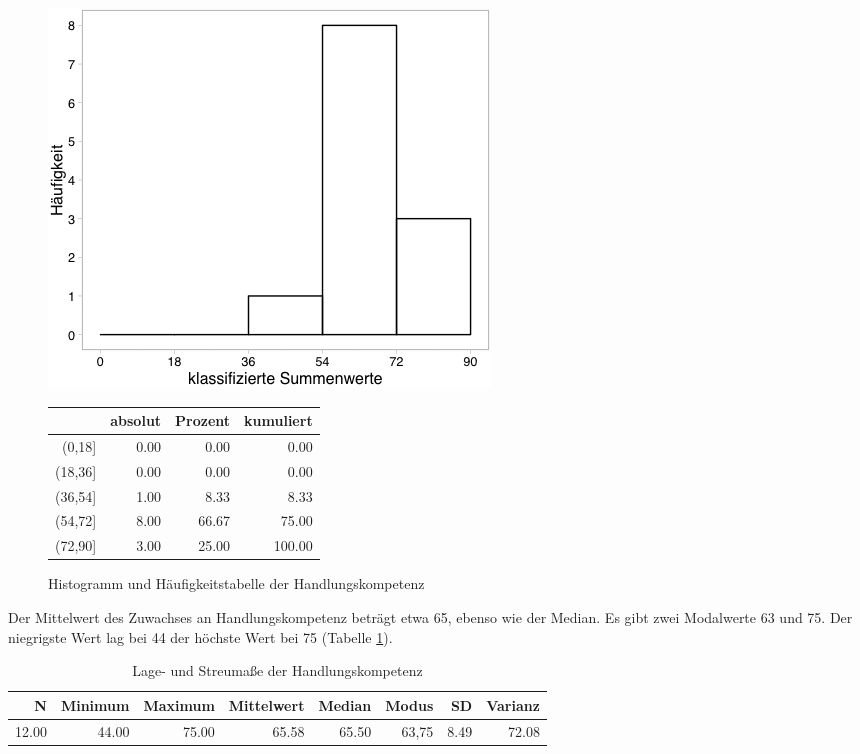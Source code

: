 \documentclass[12pt,smallheadings, bibliography=totoc]{scrartcl}
\begin{document}
\begin{figure}[H]
\begin{minipage}{.4\linewidth}
\includegraphics[width=0.8\linewidth]{Anhang/HKHistnn.png}

\label{pic:aufbau}
\end{minipage}
\begin{minipage}{.4\linewidth}
\centering
\raisebox{\depth}
{\begin{tabular}{rrrr}
  \hline
 & absolut & Prozent & kumuliert \\ 
  \hline
(0,18] & 0.00 & 0.00 & 0.00 \\ 
  (18,36] & 0.00 & 0.00 & 0.00 \\ 
  (36,54] & 1.00 & 8.33 & 8.33 \\ 
  (54,72] & 8.00 & 66.67 & 75.00 \\ 
  (72,90] & 3.00 & 25.00 & 100.00 \\ 
   \hline
\end{tabular}

}
\label{tab:defis}
\end{minipage}
\caption{Histogramm und Häufigkeitstabelle der Handlungskompetenz}
\label{fig:HK}
\end{figure}

Der Mittelwert des Zuwachses an Handlungskompetenz beträgt etwa 65,
ebenso wie der Median. Es gibt zwei Modalwerte 63 und 75. Der niegrigste
Wert lag bei 44 der höchste Wert bei 75 (Tabelle \ref{lHK}).

\begin{table}[H]
\centering
\caption{Lage- und Streumaße der Handlungskompetenz}
\label{lHK}
\begin{tabular}{rrrrrrrr}
  \hline
  N & Minimum & Maximum & Mittelwert & Median & Modus & SD & Varianz \\
  \hline
12.00 & 44.00 & 75.00 & 65.58 & 65.50 & 63,75 & 8.49 & 72.08 \\
   \hline
\end{tabular}
\end{table}
\end{document}
